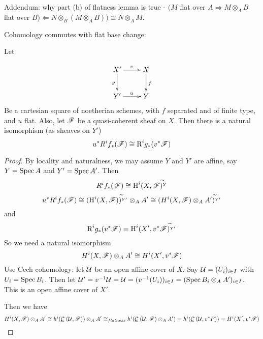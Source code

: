  \setcounter{lecture}{24}


Addendum: why part (b) of flatness lemma is true - $ (M$ flat over
$A \Rightarrow M \otimes_AB$ flat over $B$)$\Leftarrow
N\otimes_B(M\otimes_AB)) \cong N\otimes_AM$.



Cohomology commutes with flat base change:

\begin{proposition} Let

\[
\xymatrix{X' \ar[d]_g\ar[r]^v&X\ar[d]^f\\
Y'\ar[r]^u&Y } \] Be a cartesian square of noetherian schemes,
with $f$ separated and of finite type, and $u$ flat. Also, let
$\mathscr{F}$ be a quasi-coherent sheaf on $X$. Then there is a natural
isomorphism (as sheaves on $Y'$) \[
u^*R^if_*(\mathscr{F})\cong\text{R}^ig_*(v^*\mathscr{F}) \] \end{proposition}
 \begin{proof} By locality and naturalness, we
may assume $Y$ and $Y'$ are affine, say $Y = \text{\rm Spec\,}{A}$ and $Y'
=\text{\rm Spec\,}{A'}$. Then \[ R^if_*(\mathscr{F}) \cong
\text{H}^i(X,\mathscr{F})^{\widetilde{}_Y} \] \[u^*R^if_*(\mathscr{F}) \cong
(\text{H}^i(X,\mathscr{F} ))^{\widetilde{}_{Y'}}\otimes_A A' \cong
(H^i(X,\mathscr{F})\otimes_A A')^{\widetilde{}_{Y'}} \] and \[
\text{R}^ig_*(v^*\mathscr{F}) = \text{H}^i(X',v^*\mathscr{F})^{\widetilde{}_{Y'}} \]
So we need a natural isomorphism \[ H^i(X,\mathscr{F})\otimes_AA' \cong
H^i(X',v^*\mathscr{F}) \] Use Cech cohomology: let $\mathcal{U}$ be an open affine
cover of $X$. Say $\mathcal{U} = (U_i)_{i \in I}$ with $U_i = \text{\rm Spec\,}{B_i}$.
Then let $\mathcal{U}' = v^{-1}\mathcal{U} = \mathcal{U} = (v^{-1}(U_i))_{i \in I} =
(\text{\rm Spec\,}{B_i\otimes_A A'})_{i \in I}$. This is an open affine cover
of $X'$.

Then we have \[ H^i(X, \mathscr{F})\otimes_AA' \cong
h^i(\underline{\mathcal{C}}^{\cdot}(\mathcal{U},\mathscr{F}))\otimes_AA' \cong_{flatness}
h^i(\underline{\mathcal{C}}^{\cdot}(\mathcal{U},\mathscr{F})\otimes_AA') = h^i(\underline{\mathcal{C}}^{\cdot}(\mathcal{U},v^*F)) =
H^i(X',v^*\mathscr{F}) \] \end{proof}

